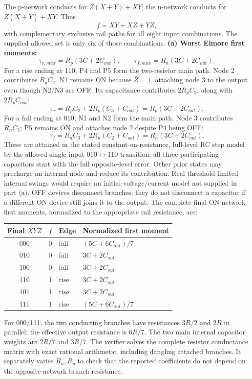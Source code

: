 \documentclass[10pt]{article}
\begin{document}
The p-network conducts for $Z(X+Y)+XY$; the n-network conducts for $\bar Z(\bar X+\bar Y)+\bar X\bar Y$. Thus
\[\boxed{f=XY+XZ+YZ},\]
with complementary exclusive rail paths for all eight input combinations. The supplied allowed set is only six of those combinations.
\textbf{(a) Worst Elmore first moments:}
\[\boxed{\tau_{r,max}=R_p(3C+2C_{out}),\qquad \tau_{f,max}=R_n(3C+2C_{out}).}\]
For a rise ending at 110, P4 and P5 form the two-resistor main path. Node 2 contributes $R_pC_2$. N1 remains ON because $\bar Z=1$, attaching node 3 to the output even though N2/N3 are OFF. Its capacitance contributes $2R_pC_3$, along with $2R_pC_{out}$:
\[\tau_r=R_pC_2+2R_p(C_3+C_{out})=R_p(3C+2C_{out}).\]
For a fall ending at 010, N1 and N2 form the main path. Node 3 contributes $R_nC_3$; P5 remains ON and attaches node 2 despite P4 being OFF:
\[\tau_f=R_nC_3+2R_n(C_2+C_{out})=R_n(3C+2C_{out}).\]
These are attained in the stated constant-on-resistance, full-level RC step model by the allowed single-input $010\leftrightarrow110$ transition: all three participating capacitors start with the full opposite-level error. Other prior states may precharge an internal node and reduce its contribution. Real threshold-limited internal swings would require an initial-voltage/current model not supplied in part (a). OFF devices disconnect branches; they do not disconnect a capacitor if a different ON device still joins it to the output.
\newpage
The complete final ON-network first moments, normalized to the appropriate rail resistance, are:
\begin{center}\begin{tabular}{clll}\toprule Final $XYZ$&$f$&Edge&Normalized first moment\\\midrule
000&0&fall&$(5C+6C_{out})/7$\\
010&0&fall&$3C+2C_{out}$\\
100&0&fall&$3C+2C_{out}$\\
110&1&rise&$3C+2C_{out}$\\
101&1&rise&$3C+2C_{out}$\\
111&1&rise&$(5C+6C_{out})/7$\\\bottomrule\end{tabular}\end{center}
For 000/111, the two conducting branches have resistances $3R/2$ and $2R$ in parallel; the effective output resistance is $6R/7$. The two main internal capacitor weights are $2R/7$ and $3R/7$. The verifier solves the complete resistor conductance matrix with exact rational arithmetic, including dangling attached branches. It separately varies $R_n,R_p$ to check that the reported coefficients do not depend on the opposite-network branch resistance.
\end{document}
